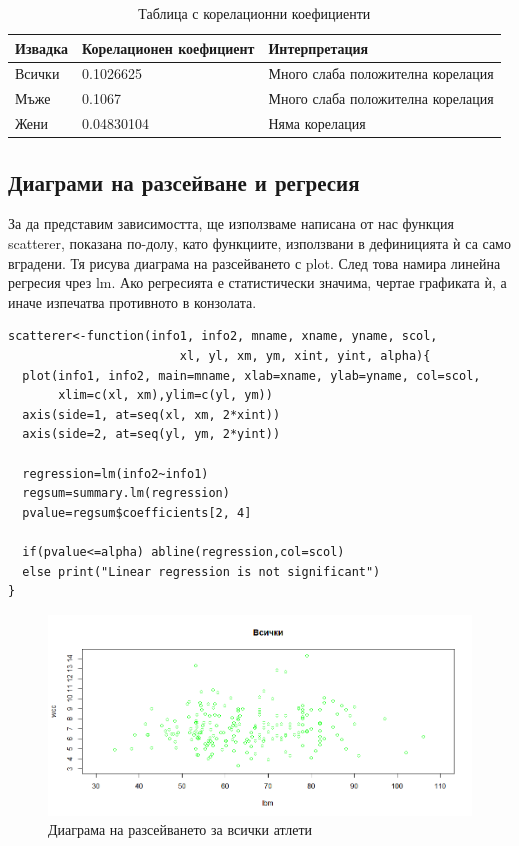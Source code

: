 \documentclass[12pt]{article}
\begin{document}
\begin{large}
\begin{table}[h!]
\centering
\begin{tabular}{|l|l|l|}
 \hline 
 Извадка & Корелационен коефициент & Интерпретация\\
 \hline \hline
 Всички & 0.1026625 & Много слаба положителна корелация \\
 \hline
 Мъже & 0.1067 & Много слаба положителна корелация \\
 \hline
 Жени & 0.04830104 & Няма корелация \\
 \hline
\end{tabular}
\caption{Таблица с корелационни коефициенти}
\end{table}

\subsection{Диаграми на разсейване и регресия}
За да представим зависимостта, ще използваме написана от нас функция scatterer, показана по-долу, като функциите, използвани в дефиницията ѝ са само вградени. Тя рисува диаграма на разсейването с plot. След това намира линейна регресия чрез lm. Ако регресията е статистически значима, чертае графиката ѝ, а иначе изпечатва противното в конзолата.

\begin{verbatim}
scatterer<-function(info1, info2, mname, xname, yname, scol,
                    	xl, yl, xm, ym, xint, yint, alpha){
  plot(info1, info2, main=mname, xlab=xname, ylab=yname, col=scol,
       xlim=c(xl, xm),ylim=c(yl, ym))
  axis(side=1, at=seq(xl, xm, 2*xint))
  axis(side=2, at=seq(yl, ym, 2*yint))
  
  regression=lm(info2~info1)
  regsum=summary.lm(regression)
  pvalue=regsum$coefficients[2, 4]
  
  if(pvalue<=alpha) abline(regression,col=scol)
  else print("Linear regression is not significant")
}
\end{verbatim}

\begin{figure}[!h!]
\includegraphics[width=\textwidth,height=\textheight,keepaspectratio]{pics/scatterall}
\caption{Диаграма на разсейването за всички атлети}
\end{figure}


\end{large}
\end{document}
